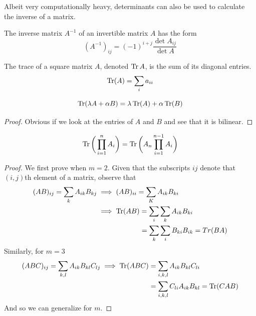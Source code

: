   Albeit very computationally heavy, determinants can also be used to calculate the inverse of a matrix. 

  \begin{theorem}
    The inverse matrix $A^{-1}$ of an invertible matrix $A$ has the form 
    \begin{equation}
      (A^{-1})_{i j} = (-1)^{i+j} \frac{\det{A_{i j}}}{\det{A}}
    \end{equation}
  \end{theorem}

  \begin{definition}
    The trace of a square matrix $A$, denoted $\operatorname{Tr}{A}$, is the sum of its diagonal entries. 
    \begin{equation}
      \operatorname{Tr}(A) = \sum_{i} a_{ii}
    \end{equation}
  \end{definition}

  \begin{theorem}
    \begin{equation}
      \operatorname{Tr}(\lambda A + \alpha B) = \lambda \operatorname{Tr}(A) + \alpha \operatorname{Tr}(B)
    \end{equation}
  \end{theorem}
  \begin{proof}
    Obvious if we look at the entries of $A$ and $B$ and see that it is bilinear.
  \end{proof}

  \begin{theorem}
    \begin{equation}
      \operatorname{Tr}{\bigg(\prod_{i=1}^n A_i\bigg)} = \operatorname{Tr}{\bigg(A_n \prod_{i=1}^{n-1} A_i\bigg)}
    \end{equation}
  \end{theorem}
  \begin{proof}
    We first prove when $m=2$. Given that the subscripts $i j$ denote that $(i,j)$th element of a matrix, observe that
    \begin{align*}
      (AB)_{ij} = \sum_{k} A_{ik} B_{kj} & \implies (AB)_{ii} = \sum_{K} A_{ik} B_{ki} \\
      & \implies \operatorname{Tr}(AB) = \sum_{i} \sum_{k} A_{ik} B_{ki} \\
      & \;\;\;\;\;\;\;\;\;\;\;\;\;\;\;\;\;\;\;\;\;\;= \sum_{k} \sum_{i} B_{ki} B_{ik} = Tr(BA)
    \end{align*}
    Similarly, for $m=3$
    \begin{align*}
      (ABC)_{ij} = \sum_{k,l} A_{ik} B_{kl} C_{lj} \implies \operatorname{Tr}(ABC) & = \sum_{i,k,l} A_{ik} B_{kl} C_{li} \\ 
                                                                     & = \sum_{i,k,l} C_{li} A_{ik} B_{kl} = \operatorname{Tr}(CAB)
    \end{align*}
    And so we can generalize for $m$. 
  \end{proof}

